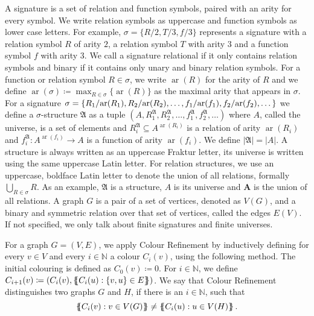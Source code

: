 A signature is a set of relation and function symbols, paired with an arity for every symbol.
We write relation symbols as uppercase and function symbols as lower case letters.
For example, $\sigma=\{R/2, T/3, f/3\}$ represents a signature with a relation symbol $R$ of arity $2$, a relation symbol $T$ with arity $3$ and a function symbol $f$ with arity $3$.
We call a signature relational if it only contains relation symbols and binary if it contains only unary and binary relation symbols.
For a function or relation symbol $R\in \sigma$, we write $\operatorname{ar}(R)$ for the arity of $R$ and we define $\operatorname{ar}(\sigma)\coloneqq \max_{R\in\sigma}\{\operatorname{ar}(R)\}$ as the maximal arity that appears in $\sigma$.
For a signature 
$\sigma=\{R_1/\kern-.15em\operatorname{ar}(R_1), R_2/\kern-.15em\operatorname{ar}(R_2), \dots, f_1/\kern-.15em\operatorname{ar}(f_1),f_2/\kern-.15em\operatorname{ar}(f_2),\dots\}$
 we define a $\sigma$-structure $\mathfrak A$ as a tuple $(A,R_1^{\mathfrak A},R_2^{\mathfrak A},\dots,f_1^{\mathfrak A},f_2^{\mathfrak A},\dots)$ where $A$, called the universe, is a set of elements and $R_i^{\mathfrak A}\subseteq A^{\operatorname{ar}(R_i)}$ is a relation of arity $\operatorname{ar}(R_i)$ and $f_i^{\mathfrak A}:A^{\operatorname{ar}(f_i)}\to A$ is a function of arity $\operatorname{ar}(f_i)$.
We define $\vert \mathfrak A\vert =\vert A \vert$.
A structure is always written as an uppercase Fraktur letter, its universe is written using the same uppercase Latin letter.
For relation structures, we use an uppercase, boldface Latin letter to denote the union of all relations, formally $\bigcup_{R\in\sigma}R$.
As an example, $\mathfrak A$ is a structure, $A$ is its universe and $\mathbf A$ is the union of all relations.
A graph $G$ is a pair of a set of vertices, denoted as $V(G)$, and a binary and symmetric relation over that set of vertices, called the edges $E(V)$.
If not specified, we only talk about finite signatures and finite universes.

For a graph $G=(V,E)$, we apply Colour Refinement by inductively defining for every $v\in V$ and every $i\in \mathbb N$ a colour $C_i(v)$, using the following method.
The initial colouring is defined as $C_0(v)\coloneqq0$.
For $i\in \mathbb N$, we define $C_{i+1}(v)\coloneqq(C_i(v), \left\{\kern-.35em\left\{C_i(u) : \{v,u\}\in E\right\}\kern-.35em\right\})$.
We say that Colour Refinement distinguishes two graphs $G$ and $H$, if there is an $i\in \mathbb N$, such that 
$$\left\{\kern-.35em\left\{C_i(v) : v\in V(G)\right\}\kern-.35em\right\}\neq \left\{\kern-.35em\left\{C_i(u) : u \in V(H)\right\}\kern-.35em\right\}.$$


